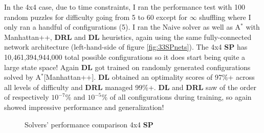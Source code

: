 

In the 4x4 case, due to time constraints, I ran the performance test with 100 random puzzles for difficulty going from 5 to 60 except for $\infty$ shuffling where I only ran a handful of configurations (5). I ran the Naive solver as well as A$^{*}$ with Manhattan++, \textbf{DRL} and \textbf{DL} heuristics, again using the same fully-connected network architecture (left-hand-side of figure \ref{fig:33SPnets}). The 4x4 \textbf{SP} has 10,461,394,944,000 total possible configurations so it does start being quite a large state space! Again \textbf{DL} got trained on randomly generated configurations solved by A$^{*}$[Manhattan++]. \textbf{DL} obtained an optimality scores of 97\%+ across all levels of difficulty and \textbf{DRL} managed 99\%+. \textbf{DL} and \textbf{DRL} saw of the order of respectively $10^{-7}$\% and $10^{-5}$\% of all configurations during training, so again showed impressive performance and generalization!


\label{ssec:44SPSC}

\begin{figure}[H]
  \noindent
  \caption[44SPPerformance]{Solvers' performance comparison 4x4 \textbf{SP}}
  \label{fig:44SPPerformance}
\end{figure}

